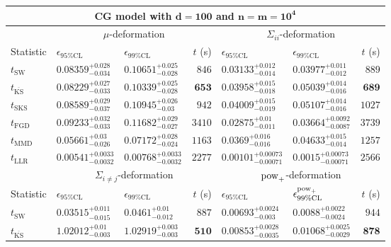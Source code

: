 \begin{tabular}{l|llr|llr}
	\toprule
	\multicolumn{7}{c}{{\bf CG model with $\mathbf{d=100}$ and $\mathbf{n=m=10^{4}}$}} \\
	\toprule
	\multicolumn{1}{c}{} & \multicolumn{3}{c}{$\mu$-deformation} & \multicolumn{3}{c}{$\Sigma_{ii}$-deformation} \\
	Statistic & $\epsilon_{95\%\mathrm{CL}}$ & $\epsilon_{99\%\mathrm    {CL}}$ & $t$ (s) & $\epsilon_{95\%\mathrm{CL}}$ & $\epsilon_{99\%\mathrm{CL}}$ & $t$ (s) \\
	\midrule
	$t_{\mathrm{SW}}$ & $0.08359_{-0.034}^{+0.028}$ & $0.10651_{-0.028}^{+0.025}$ & $846$ & $0.03133_{-0.014}^{+0.012}$ & $0.03977_{-0.012}^{+0.011}$ & $889$ \\
	$t_{\overline{\mathrm{KS}}}$ & $0.08229_{-0.033}^{+0.027}$ & $0.10339_{-0.028}^{+0.025}$ & ${\mathbf{653}}$ & $0.03958_{-0.018}^{+0.015}$ & $0.05039_{-0.016}^{+0.014}$ & ${\mathbf{689}}$ \\
	$t_{\mathrm{SKS}}$ & $0.08589_{-0.037}^{+0.029}$ & $0.10945_{-0.03}^{+0.026}$ & $942$ & $0.04009_{-0.019}^{+0.015}$ & $0.05107_{-0.016}^{+0.014}$ & $1027$ \\
	$t_{\mathrm{FGD}}$ & $0.09233_{-0.033}^{+0.032}$ & $0.11682_{-0.027}^{+0.029}$ & $3410$ & ${\mathbf{0.02875_{-0.011}^{+0.01}}}$ & ${\mathbf{0.03664_{-0.0087}^{+0.0092}}}$ & $3739$ \\
	$t_{\mathrm{MMD}}$ & ${\mathbf{0.05661_{-0.026}^{+0.03}}}$ & ${\mathbf{0.07172_{-0.024}^{+0.028}}}$ & $1163$ & $0.0369_{-0.016}^{+0.016}$ & $0.04633_{-0.014}^{+0.015}$ & $1257$ \\
	$t_{\mathrm{LLR}}$ & $0.00541_{-0.0032}^{+0.0033}$ & $0.00768_{-0.0032}^{+0.0033}$ & $2277$ & $0.00101_{-0.00071}^{+0.00073}$ & $0.0015_{-0.00071}^{+0.00073}$ & $2566$ \\
	\toprule
	\multicolumn{1}{c}{} & \multicolumn{3}{c}{$\Sigma_{i\neq j}$-deformation} & \multicolumn{3}{c}{$\rm{pow}_{+}$-deformation} \\
	Statistic & $\epsilon_{95\%\mathrm{CL}}$ & $\epsilon_{99\%\mathrm{CL}}$ & $t$ (s) & $\epsilon_{95\%\mathrm{CL}}$ & $\epsilon^{\rm   {pow}_{+}}_{99\%\mathrm{CL}}$ & $t$ (s) \\
	\midrule
	$t_{\mathrm{SW}}$ & $0.03515_{-0.015}^{+0.011}$ & $0.0461_{-0.012}^{+0.01}$ & $887$ & $0.00693_{-0.003}^{+0.0024}$ & $0.0088_{-0.0024}^{+0.0022}$ & $944$ \\
	$t_{\overline{\mathrm{KS}}}$ & $1.02012_{-0.003}^{+0.01}$ & $1.02919_{-0.003}^{+0.003}$ & ${\mathbf{510}}$ & $0.00853_{-0.0035}^{+0.0028}$ & $0.01068_{-0.0029}^{+0.0025}$ & ${\mathbf{878}}$ \\

\end{tabular}
